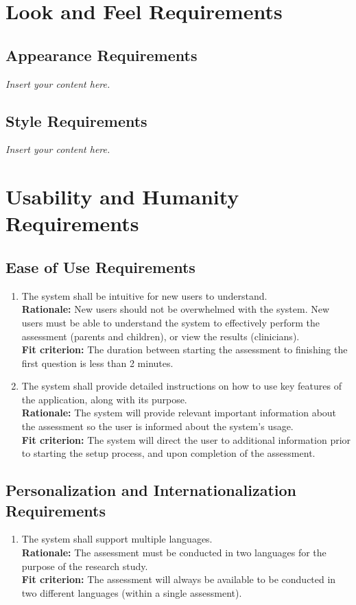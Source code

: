 \documentclass[12pt]{article}
\newcommand{\lips}{\textit{Insert your content here.}}
\begin{document}
\section{Look and Feel Requirements}
\subsection{Appearance Requirements}
\lips
\subsection{Style Requirements}
\lips

\section{Usability and Humanity Requirements}
\subsection{Ease of Use Requirements}
\begin{enumerate}[{UH-EOU}1. ]
  \item The system shall be intuitive for new users to understand.\\
  \textbf{Rationale: }New users should not be overwhelmed with the system. New users must be able to understand the system to effectively perform the assessment (parents and children), or view the results (clinicians).\\
  \textbf{Fit criterion: }The duration between starting the assessment to finishing the first question is less than 2 minutes.
  \item The system shall provide detailed instructions on how to use key features of the application, along with its purpose.\\
  \textbf{Rationale: }The system will provide relevant important information about the assessment so the user is informed about the system's usage.\\ 
  \textbf{Fit criterion: }The system will direct the user to additional information prior to starting the setup process, and upon completion of the assessment.
\end{enumerate}
\subsection{Personalization and Internationalization Requirements}
\begin{enumerate}[{UH-PI}1. ]
  \item The system shall support multiple languages.\\
  \textbf{Rationale: }The assessment must be conducted in two languages for the purpose of the research study.\\
  \textbf{Fit criterion: }The assessment will always be available to be conducted in two different languages (within a single assessment).
\end{enumerate}
\end{document}
